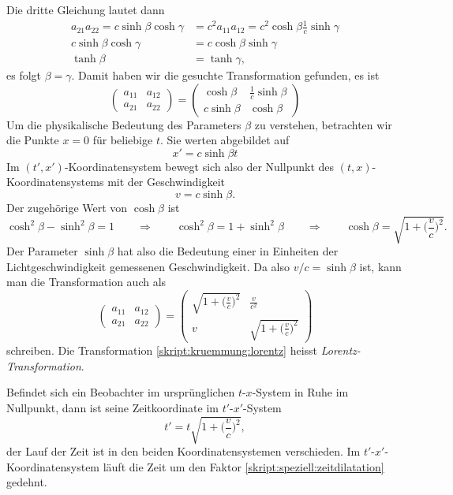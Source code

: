 Die dritte Gleichung lautet dann
\begin{align*}
a_{21}a_{22}=c\sinh\beta\cosh\gamma
&=
c^2a_{11}a_{12}=c^2\cosh\beta\frac1c\sinh\gamma
\\
c\sinh\beta\cosh\gamma
&=
c\cosh\beta\sinh\gamma
\\
\tanh\beta&=\tanh\gamma,
\end{align*}
es folgt $\beta=\gamma$.
Damit haben wir die gesuchte Transformation gefunden, es ist
\begin{equation}
\begin{pmatrix}
a_{11}&a_{12}\\
a_{21}&a_{22}
\end{pmatrix}
=
\begin{pmatrix}
 \cosh\beta&\frac1c\sinh\beta\\
c\sinh\beta&\cosh\beta
\end{pmatrix}
\end{equation}
Um die physikalische Bedeutung des Parameters $\beta$ zu verstehen, 
betrachten wir die Punkte $x=0$ für beliebige $t$.
Sie werten abgebildet auf
\[
x' = c\sinh\beta t
\]
Im $(t',x')$-Koordinatensystem bewegt sich also der Nullpunkt des 
$(t,x)$-Koordinatensystems mit der Geschwindigkeit
\[
v=c\sinh\beta.
\]
Der zugehörige Wert von $\cosh \beta$ ist
\[
\cosh^2\beta - \sinh^2\beta = 1
\qquad \Rightarrow \qquad
\cosh^2\beta = 1+\sinh^2\beta
\qquad \Rightarrow \qquad
\cosh\beta = \sqrt{1+\biggl(\frac{v}{c}\biggr)^2}.
\]
Der Parameter $\sinh\beta$ hat also die Bedeutung einer in Einheiten
der Lichtgeschwindigkeit gemessenen Geschwindigkeit.
Da also $v/c=\sinh\beta$ ist, kann man die Transformation auch
als
\begin{equation}
\begin{pmatrix}
a_{11}&a_{12}\\
a_{21}&a_{22}
\end{pmatrix}
=
\begin{pmatrix}
\displaystyle\sqrt{1+\biggl(\frac{v}{c}\biggr)^2}
	&\displaystyle\frac{v}{c^2} \\
v
	&\displaystyle\sqrt{1+\biggl(\frac{v}{c}\biggr)^2}
\end{pmatrix}
\label{skript:kruemmung:lorentz}
\end{equation}
schreiben.
Die Transformation 
\eqref{skript:kruemmung:lorentz}
heisst {\em Lorentz-Transformation}.

Befindet sich ein Beobachter im ursprünglichen $t$-$x$-System in Ruhe
im Nullpunkt, dann ist seine Zeitkoordinate im $t'$-$x'$-System
\begin{equation}
t'=t\sqrt{1+\biggl(\frac{v}{c}\biggr)^2},
\label{skript:speziell:zeitdilatation}
\end{equation}
der Lauf der Zeit ist in den beiden Koordinatensystemen verschieden.
Im $t'$-$x'$-Koordinatensystem läuft die Zeit um den Faktor
\eqref{skript:speziell:zeitdilatation} gedehnt.

